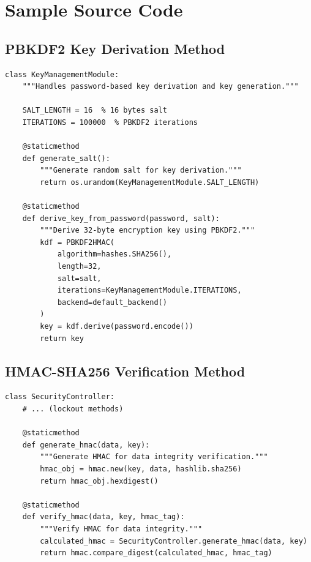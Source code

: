 \documentclass[12pt,a4paper]{report}
\begin{document}
\appendix
\chapter{Sample Source Code}

\section{PBKDF2 Key Derivation Method}
\begin{lstlisting}
class KeyManagementModule:
    """Handles password-based key derivation and key generation."""
    
    SALT_LENGTH = 16  % 16 bytes salt
    ITERATIONS = 100000  % PBKDF2 iterations
    
    @staticmethod
    def generate_salt():
        """Generate random salt for key derivation."""
        return os.urandom(KeyManagementModule.SALT_LENGTH)
    
    @staticmethod
    def derive_key_from_password(password, salt):
        """Derive 32-byte encryption key using PBKDF2."""
        kdf = PBKDF2HMAC(
            algorithm=hashes.SHA256(),
            length=32,
            salt=salt,
            iterations=KeyManagementModule.ITERATIONS,
            backend=default_backend()
        )
        key = kdf.derive(password.encode())
        return key
\end{lstlisting}

\section{HMAC-SHA256 Verification Method}
\begin{lstlisting}
class SecurityController:
    # ... (lockout methods)

    @staticmethod
    def generate_hmac(data, key):
        """Generate HMAC for data integrity verification."""
        hmac_obj = hmac.new(key, data, hashlib.sha256)
        return hmac_obj.hexdigest()
    
    @staticmethod
    def verify_hmac(data, key, hmac_tag):
        """Verify HMAC for data integrity."""
        calculated_hmac = SecurityController.generate_hmac(data, key)
        return hmac.compare_digest(calculated_hmac, hmac_tag)
\end{lstlisting}
\end{document}
